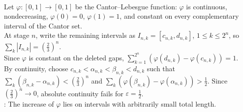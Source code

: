 \begin{example} \label{ex:cantor-function-not-absolutely-continuous} \\
Let $\varphi:[0,1]\to[0,1]$ be the Cantor--Lebesgue function: $\varphi$ is continuous, nondecreasing, $\varphi(0)=0$, $\varphi(1)=1$, and constant on every complementary interval of the Cantor set.\\
At stage $n$, write the remaining intervals as $I_{n,k}=[c_{n,k},d_{n,k}]$, $1\leq k\leq2^n$, so $\sum\limits_k|I_{n,k}|=(\frac{2}{3})^n$.\\
Since $\varphi$ is constant on the deleted gaps, $\sum\limits_{k=1}^{2^n}(\varphi(d_{n,k})-\varphi(c_{n,k}))=1$.\\
By continuity, choose $c_{n,k}<\alpha_{n,k}<\beta_{n,k}<d_{n,k}$ such that
$\sum\limits_k(\beta_{n,k}-\alpha_{n,k})<(\frac{2}{3})^n$ and $\sum\limits_k(\varphi(\beta_{n,k})-\varphi(\alpha_{n,k}))>\frac{1}{2}.$
Since $(\frac{2}{3})^n\to0$, absolute continuity fails for $\varepsilon=\frac{1}{2}$.\\
: The increase of $\varphi$ lies on intervals with arbitrarily small total length.
\end{example}

